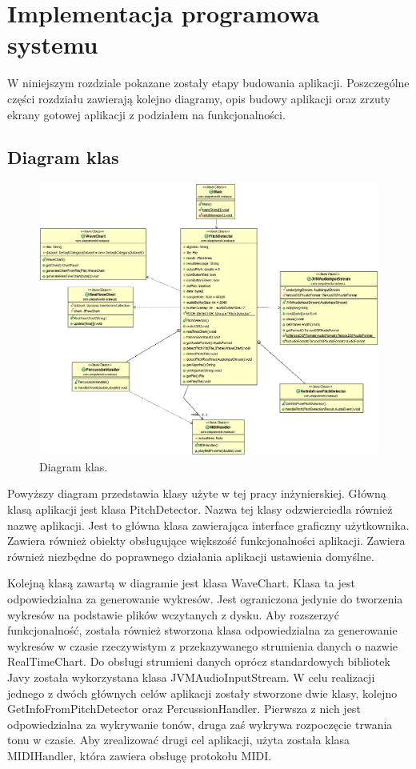 \chapter{{Implementacja programowa systemu}}
\label{chapter:implementacja}
\thispagestyle{empty}

W niniejszym rozdziale pokazane zostały etapy budowania aplikacji. Poszczególne części rozdziału zawierają kolejno diagramy, opis budowy aplikacji oraz zrzuty ekrany gotowej aplikacji z podziałem na funkcjonalności.

\section{{Diagram klas}}

\begin{figure}[h!]
  \centering
  \includegraphics[width=1\linewidth]{rys/diagram1}
  \caption{Diagram klas.}
  \label{fig:schemat}
\end{figure}

Powyższy diagram przedstawia klasy użyte w tej pracy inżynierskiej. Główną klasą aplikacji jest klasa PitchDetector. Nazwa tej klasy odzwierciedla również nazwę aplikacji. Jest to główna klasa zawierająca interface graficzny użytkownika. Zawiera również obiekty obsługujące większość funkcjonalności aplikacji. Zawiera również niezbędne do poprawnego działania aplikacji ustawienia domyślne. 


Kolejną klasą zawartą w diagramie jest klasa WaveChart. Klasa ta jest odpowiedzialna za generowanie wykresów. Jest ograniczona jedynie do tworzenia wykresów na podstawie plików wczytanych z dysku. Aby rozszerzyć funkcjonalność, została również stworzona klasa odpowiedzialna za generowanie wykresów w czasie rzeczywistym z przekazywanego strumienia danych o nazwie RealTimeChart. Do obsługi strumieni danych oprócz standardowych bibliotek Javy została wykorzystana klasa JVMAudioInputStream. W celu realizacji jednego z dwóch głównych celów aplikacji zostały stworzone dwie klasy, kolejno GetInfoFromPitchDetector oraz PercussionHandler. Pierwsza z nich jest odpowiedzialna za wykrywanie tonów, druga zaś wykrywa rozpoczęcie trwania tonu w czasie. Aby zrealizować drugi cel aplikacji, użyta została klasa MIDIHandler, która zawiera obsługę protokołu MIDI.


